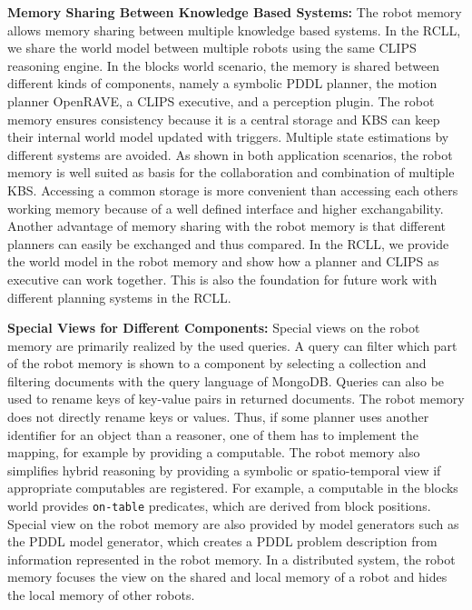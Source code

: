 \textbf{Memory Sharing Between Knowledge Based Systems:}
The robot memory allows memory sharing between multiple knowledge
based systems. In the RCLL, we share the world model between multiple
robots using the same CLIPS reasoning engine. In the blocks world
scenario, the memory is shared between different kinds of components,
namely a symbolic PDDL planner, the motion planner OpenRAVE, a CLIPS
executive, and a perception plugin. The robot memory ensures
consistency because it is a
central storage and KBS can keep their internal world model updated
with triggers. Multiple state estimations by
different systems are avoided.  As shown in both application
scenarios, the robot memory is well suited as basis for the
collaboration and combination of multiple KBS. Accessing a common
storage is more convenient than accessing each others working memory
because of a well defined interface and higher exchangability.
Another advantage of memory sharing with the
robot memory is that different planners can easily be exchanged and
thus compared. In the RCLL, we provide the world model in the robot
memory and show how a planner and CLIPS as executive can work
together. This is also the foundation for future work with different
planning systems in the RCLL.

\textbf{Special Views for Different Components:} 
Special views on the robot memory are
primarily realized by the used queries. A query can
filter which part of the robot memory is shown to a component by
selecting a collection and filtering documents with the query language
of MongoDB. Queries can also be used to rename keys of key-value pairs
in returned documents. The robot memory does not directly rename keys
or values. Thus, if some planner uses another identifier for an object
than a reasoner, one of them has to implement the mapping, for example
by providing a computable. The robot memory also simplifies hybrid
reasoning by providing a symbolic or spatio-temporal view if
appropriate computables are registered. For example, a computable in the blocks world provides
\texttt{on-table} predicates, which are derived from block positions.
Special view on the robot memory are also provided by model
generators such as the PDDL model generator, which creates a PDDL
problem description from information represented in the robot memory.
In a distributed system, the robot memory focuses the view on the shared
and local memory of a robot and hides the local memory of other
robots.

